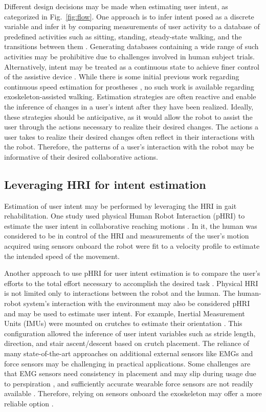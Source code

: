 Different design decisions may be made when estimating user intent, as categorized in Fig.~\ref{fig:flow}. One approach is to infer intent posed as a discrete variable and infer it by comparing measurements of user activity to a database of predefined activities such as sitting, standing, steady-state walking, and the transitions between them \cite{shen2013motion}. Generating databases containing a wide range of such activities may be prohibitive due to challenges involved in human subject trials. Alternatively, intent may be treated as a continuous state to achieve finer control of the assistive device \cite{gambon2019characterizing, suzuki2007intention}. While there is some initial previous work regarding continuous speed estimation for prostheses \cite{best2021phase}, no such work is available regarding exoskeleton-assisted walking. Estimation strategies are often reactive and enable the inference of changes in a user's intent after they have been realized. Ideally, these strategies should be anticipative, as it would allow the robot to assist the user through the actions necessary to realize their desired changes. The actions a user takes to realize their desired changes often reflect in their interactions with the robot. Therefore, the patterns of a user's interaction with the robot may be informative of their desired collaborative actions.

\subsection{Leveraging HRI for intent estimation}\label{sec:HRI}

Estimation of user intent may be performed by leveraging the HRI in gait rehabilitation. One study used physical Human Robot Interaction (pHRI) to estimate the user intent in collaborative reaching motions  \cite{corteville2007human}. In it, the human was considered to be in control of the HRI and measurements of the user's motion acquired using sensors onboard the robot were fit to a velocity profile to estimate the intended speed of the movement. 

Another approach to use pHRI for user intent estimation is to compare the user's efforts to the total effort necessary to accomplish the desired task \cite{pehlivan2015minimal}. Physical HRI is not limited only to interactions between the robot and the human. The human-robot system's interaction with the environment may also be considered pHRI and may be used to estimate user intent. For example, Inertial Measurement Units (IMUs) were mounted on crutches to estimate their orientation \cite{brescianini2011ins}. This configuration allowed the inference of user intent variables such as stride length, direction, and stair ascent/descent based on crutch placement. The reliance of many state-of-the-art approaches on additional external sensors like EMGs and force sensors may be challenging in practical applications. Some challenges are that EMG sensors need consistency in placement and may slip during usage due to perspiration \cite{tkach2010study,ison2014role}, and sufficiently accurate wearable force sensors are not readily available \cite{moolchandani2021design}. Therefore, relying on sensors onboard the exoskeleton may offer a more reliable option \cite{Gambon20b}. 

